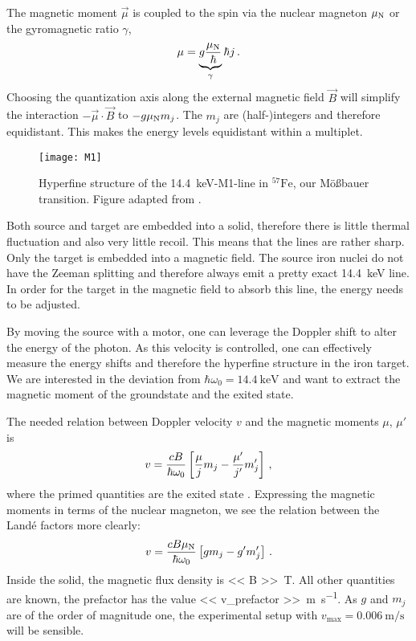 \documentclass[11pt, english, fleqn, DIV=15, headinclude, BCOR=2cm]{scrreprt}
\begin{document}
The magnetic moment $\vec \mu$ is coupled to the spin via the nuclear magneton
$\mu_\text N$ or the gyromagnetic ratio $\gamma$,
\[
    \mu = \underbrace{g \frac{\mu_\text N}{\hbar}}_{\gamma} \hbar j \,.
\]
Choosing the quantization axis along the external magnetic field $\vec B$ will
simplify the interaction $- \vec \mu \cdot \vec B$ to $- g \mu_\text N m_j$.
The $m_j$ are (half-)integers and therefore equidistant. This makes the energy
levels equidistant within a multiplet.

\begin{figure}
    \centering
    \texttt{[image: M1]}
    \caption{%
        Hyperfine structure of the \SI{14.4}{\kilo\electronvolt}-M1-line in
        $^{57}\mathrm{Fe}$, our Mößbauer transition.
        Figure adapted from
        \textcite[Fig.~4.22]{Schatz/Nukleare_Festkoerperphysik}.
    }
    \label{fig:M1}
\end{figure}

Both source and target are embedded into a solid, therefore there is
little thermal fluctuation and also very little recoil. This means that the
lines are rather sharp. Only the target is embedded into a magnetic field. The
source iron nuclei do not have the Zeeman splitting and therefore always emit a
pretty exact \SI{14.4}{\kilo\electronvolt} line. In order for the target in the
magnetic field to absorb this line, the energy needs to be adjusted.

By moving the source with a motor, one can leverage the Doppler shift to alter
the energy of the photon. As this velocity is controlled, one can effectively
measure the energy shifts and therefore the hyperfine structure in the iron
target. We are interested in the deviation from $\hbar \omega_0 =
\SI{14.4}{\kilo\electronvolt}$ and want to extract the magnetic moment of the
groundstate and the exited state.

The needed relation between Doppler velocity $v$ and the magnetic moments
$\mu$, $\mu'$ is
\[
    v = \frac{c B}{\hbar \omega_0}
    \left[ \frac{\mu}{j} m_j - \frac{\mu'}{j'} m_j' \right]
    \,,
\]
where the primed quantities are the exited state
\parencite[(4.42)]{Schatz/Nukleare_Festkoerperphysik}. Expressing the magnetic
moments in terms of the nuclear magneton, we see the relation between the Landé
factors more clearly:
\begin{equation}
    \label{eq:velocity}
    v = \frac{c B \mu_\text N}{\hbar \omega_0} \left[ g m_j - g' m_j' \right] \,.
\end{equation}
Inside the solid, the magnetic flux density is \SI{<< B >>}{\tesla}. All other
quantities are known,
the prefactor has the value \SI{<< v_prefactor >>}{\meter\per\second}. As $g$
and $m_j$ are of the order of magnitude one, the experimental setup with
$v_\text{max} = \SI{0.006}{\meter\per\second}$ will be sensible.
\end{document}
